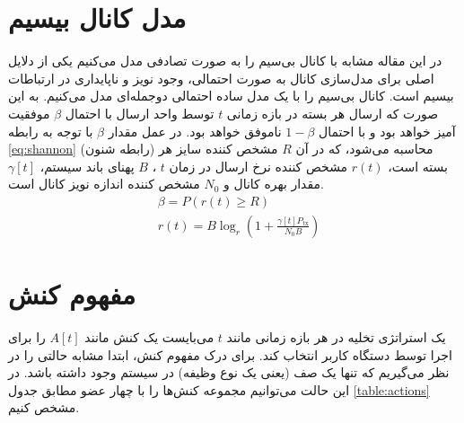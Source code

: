 \section{مدل کانال بیسیم}
\label{sec:wireless}
در این مقاله مشابه با \cite{Liu} کانال بی‌سیم را به صورت تصادفی مدل می‌کنیم یکی از دلایل اصلی برای مدل‌سازی کانال به صورت احتمالی، وجود نویز و ناپایداری در ارتباطات بیسیم است. کانال بی‌سیم را با یک مدل ساده احتمالی دوجمله‌ای  مدل می‌کنیم. به این صورت که ارسال هر بسته در بازه زمانی $t$ توسط واحد ارسال با احتمال \(\beta\) موفقیت آمیز خواهد بود و با احتمال \(1 - \beta\) ناموفق خواهد بود. در عمل مقدار \(\beta\) با توجه به رابطه \ref{eq:shannon} (رابطه شنون) محاسبه می‌شود، که در آن \(R\) مشخص کننده سایز هر بسته است،
$r(t)$
مشخص کننده نرخ ارسال در زمان
$t$
،
 \(B\) پهنای باند سیستم، \(\gamma[t]\) مقدار بهره کانال و \(N_0\) مشخص کننده اندازه نویز کانال است.
\begin{equation}
	\label{eq:shannon}
	\begin{aligned}
		&\beta=P(r(t) \geq R) \\
		&r(t)=B \log _{r}\left(1+\frac{\gamma[t] P_{\mathrm{tx}}}{N_0 B}\right)
	\end{aligned}
\end{equation}
\section{مفهوم کنش}
\label{sec:action}
یک استراتژی تخلیه در هر بازه زمانی مانند \(t\) می‌بایست یک کنش مانند \(A[t]\) را برای اجرا توسط دستگاه کاربر انتخاب کند. برای درک مفهوم کنش، ابتدا مشابه \cite{Liu} حالتی را در نظر می‌گیریم که تنها یک صف (یعنی یک نوع وظیفه) در سیستم وجود داشته باشد. در این حالت می‌توانیم مجموعه کنش‌ها را با چهار عضو مطابق جدول \ref{table:actions} مشخص کنیم.

